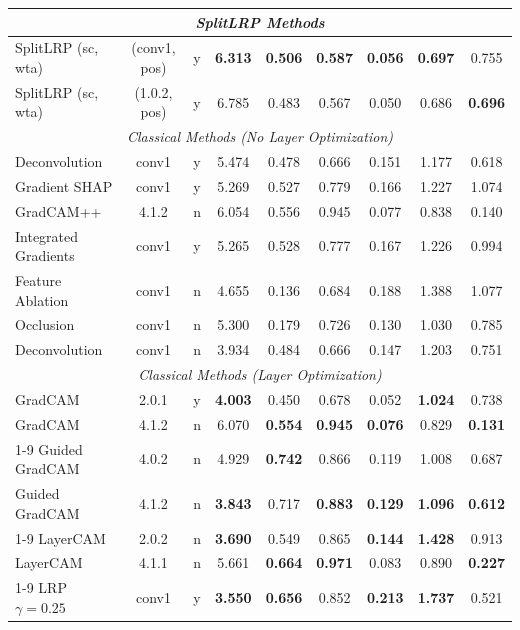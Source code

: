 \begin{longtable}{p{4cm}|cc|cccccc}
    \midrule
    \multicolumn{9}{c}{\textit{SplitLRP Methods}} \\
    \midrule
    SplitLRP (sc, wta) & (conv1, pos) & y & \textbf{6.313} & \textbf{0.506} & \textbf{0.587} & \textbf{0.056} & \textbf{0.697} & 0.755 \\
    SplitLRP (sc, wta) & (1.0.2, pos) & y & 6.785 & 0.483 & 0.567 & 0.050 & 0.686 & \textbf{0.696} \\
    \midrule
    \multicolumn{9}{c}{\textit{Classical Methods (No Layer Optimization)}} \\
    \midrule
    Deconvolution & conv1 & y & 5.474 & 0.478 & 0.666 & 0.151 & 1.177 & 0.618 \\
    Gradient SHAP & conv1 & y & 5.269 & 0.527 & 0.779 & 0.166 & 1.227 & 1.074 \\
    GradCAM++ & 4.1.2 & n & 6.054 & 0.556 & 0.945 & 0.077 & 0.838 & 0.140 \\
    Integrated Gradients & conv1 & y & 5.265 & 0.528 & 0.777 & 0.167 & 1.226 & 0.994 \\
    Feature Ablation & conv1 & n & 4.655 & 0.136 & 0.684 & 0.188 & 1.388 & 1.077 \\
    Occlusion & conv1 & n & 5.300 & 0.179 & 0.726 & 0.130 & 1.030 & 0.785 \\
    Deconvolution & conv1 & n & 3.934 & 0.484 & 0.666 & 0.147 & 1.203 & 0.751 \\
    \midrule
    \multicolumn{9}{c}{\textit{Classical Methods (Layer Optimization)}} \\
    \midrule
    GradCAM & 2.0.1 & y & \textbf{4.003} & 0.450 & 0.678 & 0.052 & \textbf{1.024} & 0.738 \\
    GradCAM & 4.1.2 & n & 6.070 & \textbf{0.554} & \textbf{0.945} & \textbf{0.076} & 0.829 & \fboxsep=0.5pt\colorbox{red!20}{\textbf{0.131}} \\
    \cmidrule(lr){1-9}
    Guided GradCAM & 4.0.2 & n & 4.929 & \fboxsep=0.5pt\colorbox{red!20}{\textbf{0.742}} & 0.866 & 0.119 & 1.008 & 0.687 \\
    Guided GradCAM & 4.1.2 & n & \textbf{3.843} & 0.717 & \textbf{0.883} & \textbf{0.129} & \textbf{1.096} & \textbf{0.612} \\
    \cmidrule(lr){1-9}
    LayerCAM & 2.0.2 & n & \textbf{3.690} & 0.549 & 0.865 & \textbf{0.144} & \textbf{1.428} & 0.913 \\
    LayerCAM & 4.1.1 & n & 5.661 & \textbf{0.664} & \textbf{0.971} & 0.083 & 0.890 & \textbf{0.227} \\
    \cmidrule(lr){1-9}
    LRP $\gamma=0.25$ & conv1 & y & \textbf{3.550} & \textbf{0.656} & 0.852 & \fboxsep=0.5pt\colorbox{red!20}{\textbf{0.213}} & \textbf{1.737} & 0.521 \\

\end{longtable}
